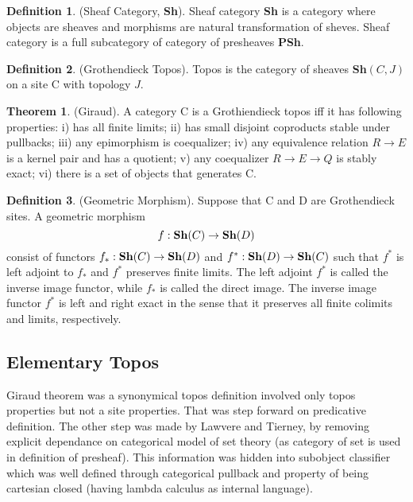 \documentclass{article}
\theoremstyle{definition}
\newtheorem{definition}{Definition}
\newtheorem{theorem}{Theorem}
\begin{document}
\begin{definition} (Sheaf Category, {\bf Sh}).
Sheaf category {\bf Sh}
is a category where objects are sheaves and morphisms are
natural transformation of sheves. Sheaf category is a full subcategory
of category of presheaves {\bf PSh}.
\end{definition}

\begin{definition} (Grothendieck Topos).
Topos is the category of sheaves {\bf Sh}$(C,J)$ on a site $\mathrm{C}$ with topology $J$.
\end{definition}

\begin{theorem} (Giraud).
A category $\mathrm{C}$ is a Grothiendieck topos iff it has following properties:
i) has all finite limits;
ii) has small disjoint coproducts stable under pullbacks;
iii) any epimorphism is coequalizer;
iv) any equivalence relation $R \rightarrow E$ is a kernel pair and has a quotient;
v) any coequalizer $R \rightarrow E \rightarrow Q$ is stably exact;
vi) there is a set of objects that generates $\mathrm{C}$.
\end{theorem}

\begin{definition} (Geometric Morphism). Suppose that $\mathrm{C}$ and $\mathrm{D}$
are Grothendieck sites. A geometric morphism
$$
    f : {\bf Sh}(C) \rightarrow {\bf Sh}(D)
$$
consist of functors $f_* : {\bf Sh}(C) \rightarrow {\bf Sh}(D)$ and
$f^* : {\bf Sh}(D) \rightarrow {\bf Sh}(C)$ such that $f^*$ is
left adjoint to $f_*$ and $f^*$ preserves finite limits. The left adjoint $f^*$ is called
the inverse image functor, while $f_*$ is called the direct image. The inverse image functor
$f^*$ is left and right exact in the sense that it preserves all finite
colimits and limits, respectively.
\end{definition}

\newpage
\subsection{Elementary Topos}

Giraud theorem was a synonymical topos definition involved only topos
properties but not a site properties. That was step forward on
predicative definition. The other step was made by Lawvere and Tierney,
by removing explicit dependance on categorical model of set
theory (as category of set is used in definition of presheaf). This information
was hidden into subobject classifier which was well defined through
categorical pullback and property of being cartesian
closed (having lambda calculus as internal language).
\end{document}
